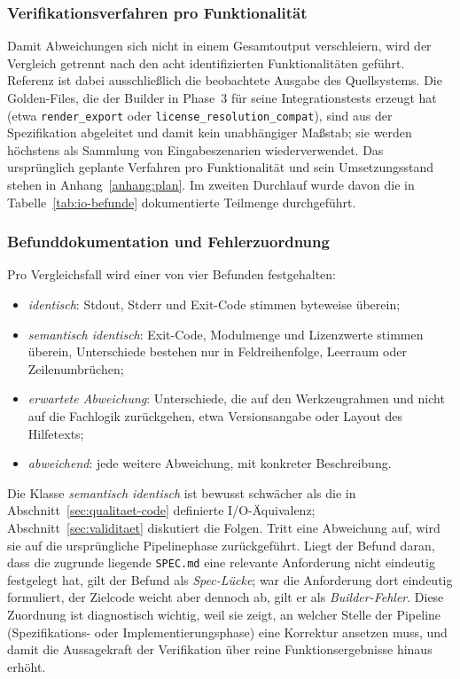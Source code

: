 \subsubsection{Verifikationsverfahren pro Funktionalität}

Damit Abweichungen sich nicht in einem Gesamtoutput verschleiern, wird der Vergleich getrennt nach den acht identifizierten Funktionalitäten geführt. Referenz ist dabei ausschließlich die beobachtete Ausgabe des Quellsystems. Die Golden-Files, die der Builder in Phase~3 für seine Integrationstests erzeugt hat (etwa \texttt{render\_export} oder \texttt{license\_resolution\_compat}), sind aus der Spezifikation abgeleitet und damit kein unabhängiger Maßstab; sie werden höchstens als Sammlung von Eingabeszenarien wiederverwendet. Das ursprünglich geplante Verfahren pro Funktionalität und sein Umsetzungsstand stehen in Anhang~\ref{anhang:plan}. Im zweiten Durchlauf wurde davon die in Tabelle~\ref{tab:io-befunde} dokumentierte Teilmenge durchgeführt.

\subsubsection{Befunddokumentation und Fehlerzuordnung}

Pro Vergleichsfall wird einer von vier Befunden festgehalten:
\begin{itemize}
  \item \emph{identisch}: Stdout, Stderr und Exit-Code stimmen byteweise überein;
  \item \emph{semantisch identisch}: Exit-Code, Modulmenge und Lizenzwerte stimmen überein, Unterschiede bestehen nur in Feldreihenfolge, Leerraum oder Zeilenumbrüchen;
  \item \emph{erwartete Abweichung}: Unterschiede, die auf den Werkzeugrahmen und nicht auf die Fachlogik zurückgehen, etwa Versionsangabe oder Layout des Hilfetexts;
  \item \emph{abweichend}: jede weitere Abweichung, mit konkreter Beschreibung.
\end{itemize}
Die Klasse \emph{semantisch identisch} ist bewusst schwächer als die in Abschnitt~\ref{sec:qualitaet-code} definierte I/O-Äquivalenz; Abschnitt~\ref{sec:validitaet} diskutiert die Folgen. Tritt eine Abweichung auf, wird sie auf die ursprüngliche Pipelinephase zurückgeführt. Liegt der Befund daran, dass die zugrunde liegende \texttt{SPEC.md} eine relevante Anforderung nicht eindeutig festgelegt hat, gilt der Befund als \emph{Spec-Lücke}; war die Anforderung dort eindeutig formuliert, der Zielcode weicht aber dennoch ab, gilt er als \emph{Builder-Fehler}. Diese Zuordnung ist diagnostisch wichtig, weil sie zeigt, an welcher Stelle der Pipeline (Spezifikations- oder Implementierungsphase) eine Korrektur ansetzen muss, und damit die Aussagekraft der Verifikation über reine Funktionsergebnisse hinaus erhöht.

